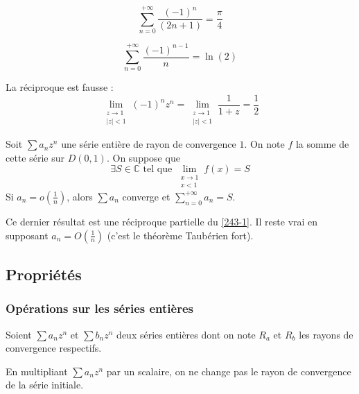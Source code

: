   \begin{application}
    \[ \sum_{n=0}^{+\infty} \frac{(-1)^n}{(2n+1)} = \frac{\pi}{4} \]
  \end{application}

  \begin{application}
    \[ \sum_{n=0}^{+\infty} \frac{(-1)^{n-1}}{n} = \ln(2) \]
  \end{application}

  \begin{cexample}
    La réciproque est fausse :
    \[ \lim_{\substack{z \rightarrow 1 \\ \vert z \vert < 1}} (-1)^n z^n = \lim_{\substack{z \rightarrow 1 \\ \vert z \vert < 1}} \frac{1}{1+z} = \frac{1}{2} \]
  \end{cexample}

  \begin{theorem}
    Soit $\sum a_n z^n$ une série entière de rayon de convergence $1$. On note $f$ la somme de cette série sur $D(0,1)$. On suppose que
    \[ \exists S \in \mathbb{C} \text{ tel que } \lim_{\substack{x \rightarrow 1 \\ x < 1}} f(x) = S \]
    Si $a_n = o \left( \frac{1}{n} \right)$, alors $\sum a_n$ converge et $\sum_{n=0}^{+\infty} a_n = S$.
  \end{theorem}

  \begin{remark}
    Ce dernier résultat est une réciproque partielle du \cref{243-1}. Il reste vrai en supposant $a_n = O \left( \frac{1}{n} \right)$ (c'est le théorème Taubérien fort).
  \end{remark}

  \subsection{Propriétés}

  \subsubsection{Opérations sur les séries entières}


  Soient $\sum a_n z^n$ et $\sum b_n z^n$ deux séries entières dont on note $R_a$ et $R_b$ les rayons de convergence respectifs.

  \begin{proposition}
    En multipliant $\sum a_n z^n$ par un scalaire, on ne change pas le rayon de convergence de la série initiale.
  \end{proposition}

